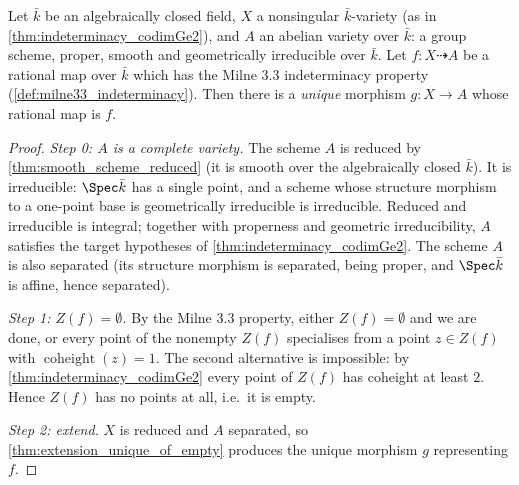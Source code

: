 \begin{theorem}
  \label{thm:extend_to_av}
  \leanok
  Let \(\bar k\) be an algebraically closed field, \(X\) a nonsingular
  \(\bar k\)-variety (as in \ref{thm:indeterminacy_codimGe2}), and \(A\) an
  abelian variety over \(\bar k\): a group scheme, proper, smooth and
  geometrically irreducible over \(\bar k\). Let \(f : X \dashrightarrow A\)
  be a rational map over \(\bar k\) which has the Milne 3.3 indeterminacy
  property (\ref{def:milne33_indeterminacy}). Then there is a \emph{unique}
  morphism \(g : X \to A\) whose rational map is \(f\).
\end{theorem}
\begin{proof}
  \leanok
  \emph{Step 0: \(A\) is a complete variety.} The scheme \(A\) is reduced by
  \ref{thm:smooth_scheme_reduced} (it is smooth over the algebraically closed
  \(\bar k\)). It is irreducible: \(\Spec \bar k\) has a single point, and a
  scheme whose structure morphism to a one-point base is geometrically
  irreducible is irreducible. Reduced and irreducible is integral; together
  with properness and geometric irreducibility, \(A\) satisfies the target
  hypotheses of \ref{thm:indeterminacy_codimGe2}. The scheme \(A\) is also
  separated (its structure morphism is separated, being proper, and
  \(\Spec \bar k\) is affine, hence separated).

  \emph{Step 1: \(Z(f) = \emptyset\).} By the Milne 3.3 property, either
  \(Z(f) = \emptyset\) and we are done, or every point of the nonempty
  \(Z(f)\) specialises from a point \(z \in Z(f)\) with
  \(\operatorname{coheight}(z) = 1\). The second alternative is impossible:
  by \ref{thm:indeterminacy_codimGe2} every point of \(Z(f)\) has coheight at
  least \(2\). Hence \(Z(f)\) has no points at all, i.e.\ it is empty.

  \emph{Step 2: extend.} \(X\) is reduced and \(A\) separated, so
  \ref{thm:extension_unique_of_empty} produces the unique morphism \(g\)
  representing \(f\).
\end{proof}

